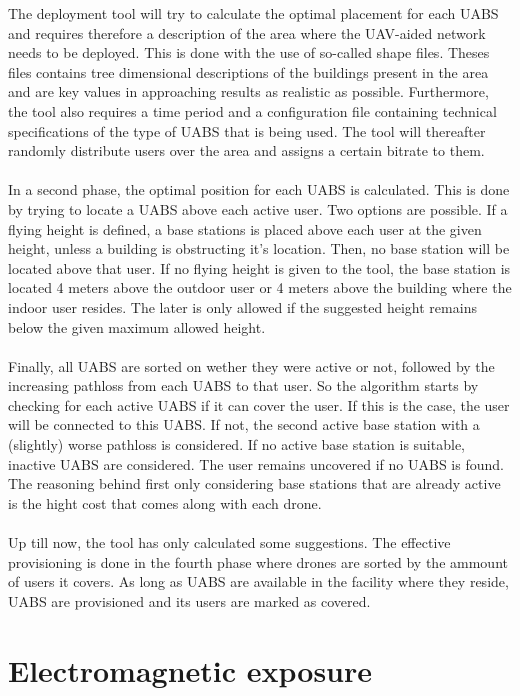 The deployment tool will try to calculate the optimal placement for each \gls{UABS} and requires therefore a description of the area where the UAV-aided network needs to 
be deployed. This is done with the use of so-called shape files. Theses files contains tree dimensional descriptions of the buildings present in the area and are
key values in approaching results as realistic as possible. Furthermore, the tool also requires a time period and a configuration file containing technical specifications of the type of \gls{UABS} that is being used. 
The tool will thereafter randomly distribute users over the area and assigns a certain bitrate to them. \\
\\
In a second phase, the optimal position for each \gls{UABS} is calculated. This is done by trying to locate a \gls{UABS} above each active user. Two options are possible.
If a flying height is defined, a base stations is placed above each user at the given height, unless a building is obstructing it's location. Then, no base station will be located above that user.
If no flying height is given to the tool, the base station is located 4 meters above the outdoor user or 4 meters above the building where the indoor user resides. 
The later is only allowed if the suggested height remains below the given maximum allowed height. \\
\\
Finally, all  \gls{UABS} are sorted on wether they were active or not, followed by the increasing pathloss from each \gls{UABS} to that user.
So the algorithm starts by checking for each active \gls{UABS} if it can cover the user. If this is the case, the user will be connected to this \gls{UABS}. If not,
the second active base station with a (slightly) worse pathloss is considered. If no active base station is suitable, inactive \gls{UABS} are considered. The user remains uncovered if no \gls{UABS}
is found. The reasoning behind first only considering base stations that are already active is the hight cost that comes along with each drone. \\
\\
Up till now, the tool has only calculated some suggestions. The effective provisioning is done in the fourth phase where drones are sorted by the ammount of users it covers. As long as \gls{UABS}
are available in the facility where they reside, \gls{UABS} are provisioned and its users are marked as covered.


\section{Electromagnetic exposure}

